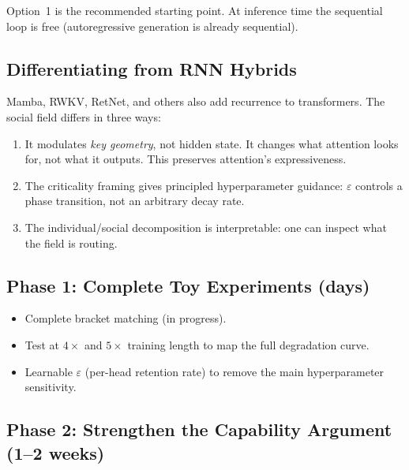\documentclass[11pt,a4paper]{article}
\begin{document}
Option~1 is the recommended starting point.  At inference time
the sequential loop is free (autoregressive generation is
already sequential).

\subsection{Differentiating from RNN Hybrids}

Mamba, RWKV, RetNet, and others also add recurrence to
transformers.  The social field differs in three ways:
\begin{enumerate}
    \item It modulates \emph{key geometry}, not hidden state.
          It changes what attention looks for, not what it outputs.
          This preserves attention's expressiveness.
    \item The criticality framing gives principled hyperparameter
          guidance: $\varepsilon$ controls a phase transition, not
          an arbitrary decay rate.
    \item The individual/social decomposition is interpretable:
          one can inspect what the field is routing.
\end{enumerate}

\subsection{Phase 1: Complete Toy Experiments (days)}

\begin{itemize}
    \item Complete bracket matching (in progress).
    \item Test at $4\times$ and $5\times$ training length to map
          the full degradation curve.
    \item Learnable $\varepsilon$ (per-head retention rate) to
          remove the main hyperparameter sensitivity.
\end{itemize}

\subsection{Phase 2: Strengthen the Capability Argument (1--2 weeks)}
\end{document}
